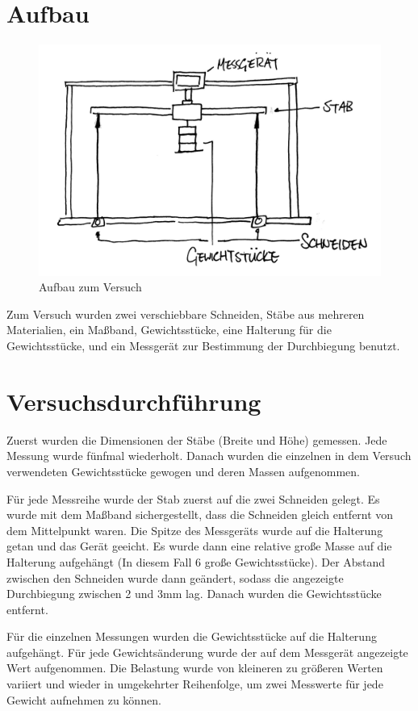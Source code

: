 \documentclass[11pt,a4paper]{article}
\begin{document}
\section{Aufbau}
\begin{figure}[h]
	\centering
	\includegraphics[width=\linewidth]{Abb1}
	\caption{Aufbau zum Versuch}
\end{figure}
Zum Versuch wurden zwei verschiebbare Schneiden, Stäbe aus mehreren Materialien, ein Maßband, Gewichtsstücke, eine Halterung für die Gewichtsstücke, und ein Messgerät zur Bestimmung der Durchbiegung benutzt. 


\section{Versuchsdurchführung}
Zuerst wurden die Dimensionen der Stäbe (Breite und Höhe) gemessen. Jede Messung wurde fünfmal wiederholt. Danach wurden die einzelnen in dem Versuch verwendeten Gewichtsstücke gewogen und deren Massen aufgenommen. 

Für jede Messreihe wurde der Stab zuerst auf die zwei Schneiden gelegt. Es wurde mit dem Maßband sichergestellt, dass die Schneiden gleich entfernt von dem Mittelpunkt waren. Die Spitze des Messgeräts wurde auf die Halterung getan und das Gerät geeicht. Es wurde dann eine relative große Masse auf die Halterung aufgehängt (In diesem Fall 6 große Gewichtsstücke). Der Abstand zwischen den Schneiden wurde dann geändert, sodass die angezeigte Durchbiegung zwischen 2 und 3mm lag. Danach wurden die Gewichtsstücke entfernt. 

Für die einzelnen Messungen wurden die Gewichtsstücke auf die Halterung aufgehängt. Für jede Gewichtsänderung wurde der auf dem Messgerät angezeigte Wert aufgenommen. Die Belastung wurde von kleineren zu größeren Werten variiert und wieder in umgekehrter Reihenfolge, um zwei Messwerte für jede Gewicht aufnehmen zu können. 
\end{document}
